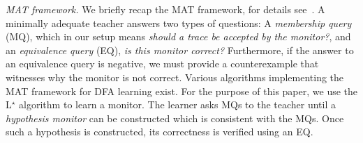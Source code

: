 \documentclass[runningheads]{llncs}
\renewcommand{\paragraph}[1]{\smallskip\noindent\emph{#1}}
\begin{document}
\paragraph{MAT framework.}
We briefly recap the MAT framework, for details see~\cite{DBLP:journals/cacm/Vaandrager17}.
A minimally adequate teacher answers two types of questions:
A \emph{membership query} (MQ), which in our setup means \emph{should a trace be accepted by the monitor?}, and an \emph{equivalence query} (EQ), \emph{is this monitor correct?}
Furthermore, if the answer to an equivalence query is negative, we must provide a counterexample that witnesses why the monitor is not correct.
Various algorithms implementing the MAT framework for DFA learning exist. For the purpose of this paper, we use the L$^{\star}$ algorithm \cite{DBLP:journals/iandc/Angluin87} to learn a monitor. The learner asks MQs to the teacher until a \emph{hypothesis monitor} can be constructed which is consistent with the MQs. Once such a hypothesis is constructed, its correctness is verified using an EQ.
\end{document}
